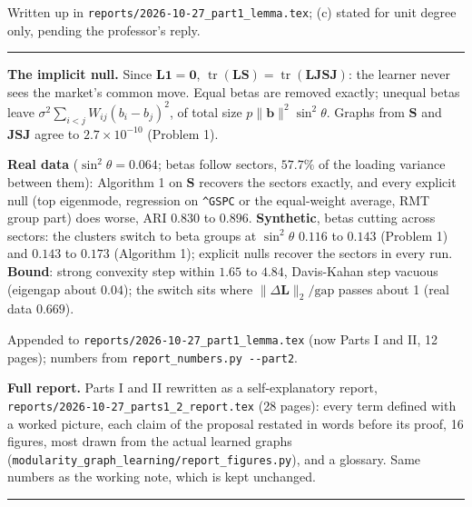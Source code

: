 \documentclass[11pt,a4paper]{article}
\newcommand{\logday}[1]{\par\vspace{3mm}\noindent{\large\textbf{#1}}\par\vspace{1mm}\hrule\vspace{2mm}\noindent}
\begin{document}
Written up in \texttt{reports/2026-10-27\_part1\_lemma.tex}; (c) stated for unit
degree only, pending the professor's reply.

\logday{27 October: Part II finished}

\textbf{The implicit null.} Since $\mathbf{L}\mathbf{1}=\mathbf{0}$,
$\operatorname{tr}(\mathbf{L}\mathbf{S})=\operatorname{tr}(\mathbf{L}\mathbf{J}\mathbf{S}\mathbf{J})$:
the learner never sees the market's common move. Equal betas are removed exactly;
unequal betas leave $\sigma^2\sum_{i<j}W_{ij}(b_i-b_j)^2$, of total size
$p\lVert\mathbf b\rVert^2\sin^2\theta$. Graphs from $\mathbf S$ and
$\mathbf{J}\mathbf{S}\mathbf{J}$ agree to $2.7\times10^{-10}$ (Problem 1).

\textbf{Real data} ($\sin^2\theta=0.064$; betas follow sectors, $57.7\%$ of the
loading variance between them): Algorithm 1 on $\mathbf S$ recovers the sectors exactly,
and every explicit null (top eigenmode, regression on \texttt{\^{}GSPC} or the
equal-weight average, RMT group part) does worse, ARI $0.830$ to $0.896$.
\textbf{Synthetic}, betas cutting across sectors: the clusters switch to beta groups at
$\sin^2\theta$ $0.116$ to $0.143$ (Problem 1) and $0.143$ to $0.173$ (Algorithm 1);
explicit nulls recover the sectors in every run. \textbf{Bound}: strong convexity step
within $1.65$ to $4.84$, Davis-Kahan step vacuous (eigengap about $0.04$); the switch sits
where $\lVert\Delta\mathbf L\rVert_2/\mathrm{gap}$ passes about 1 (real data $0.669$).

Appended to \texttt{reports/2026-10-27\_part1\_lemma.tex} (now Parts I and II, 12
pages); numbers from \texttt{report\_numbers.py -{}-part2}.

\textbf{Full report.} Parts I and II rewritten as a self-explanatory report,
\texttt{reports/2026-10-27\_parts1\_2\_report.tex} (28 pages): every term defined
with a worked picture, each claim of the proposal restated in words before its proof,
16 figures, most drawn from the actual learned graphs
(\texttt{modularity\_graph\_learning/report\_figures.py}), and a glossary. Same
numbers as the working note, which is kept unchanged.

\logday{\textcolor{gray}{dd Month: next entry here}}
\end{document}
